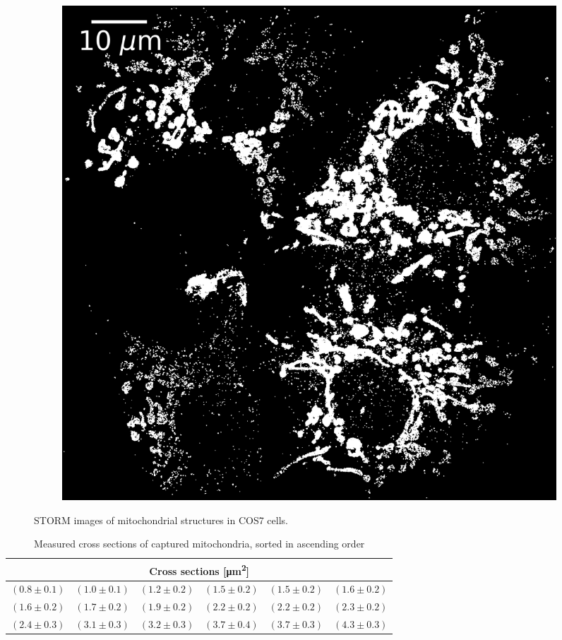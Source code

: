 \begin{figure}
\begin{subfigure}{0.49\textwidth}
        \includegraphics[width=\textwidth]{figures/mitochondria_image11.png}
        \caption{}
        \label{fig:mitochondria_image11}
    \end{subfigure}
    \caption{STORM images of mitochondrial structures in COS7 cells.}
    \label{fig:mitochondria_images}
\end{figure}

\begin{table}
    \centering
    \begin{tabular}{c|c|c|c|c|c}
        \multicolumn{6}{c}{Cross sections [\si{\micro\meter\squared}]} \\
        \hline\hline
		$\left(0.8 \pm 0.1\right)$ & $\left(1.0 \pm 0.1\right)$ & $\left(1.2 \pm 0.2\right)$ & $\left(1.5 \pm 0.2\right)$ & $\left(1.5 \pm 0.2\right)$ & $\left(1.6 \pm 0.2\right)$ \\
		$\left(1.6 \pm 0.2\right)$ & $\left(1.7 \pm 0.2\right)$ & $\left(1.9 \pm 0.2\right)$ & $\left(2.2 \pm 0.2\right)$ & $\left(2.2 \pm 0.2\right)$ & $\left(2.3 \pm 0.2\right)$ \\
		$\left(2.4 \pm 0.3\right)$ & $\left(3.1 \pm 0.3\right)$ & $\left(3.2 \pm 0.3\right)$ & $\left(3.7 \pm 0.4\right)$ & $\left(3.7 \pm 0.3\right)$ & $\left(4.3 \pm 0.3\right)$
    \end{tabular}
    \caption{Measured cross sections of captured mitochondria, sorted in ascending order}
    \label{tab:mitochondria_cross_sections}
\end{table}


